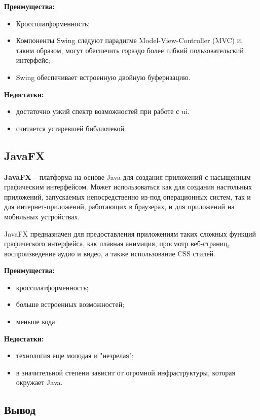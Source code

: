 \textbf{Преимущества:} 
\begin{itemize}
	\item Кроссплатформенность;
	\item Компоненты Swing следуют парадигме Model-View-Controller (MVC) и, таким образом, могут обеспечить гораздо более гибкий пользовательский интерфейс;
	\item Swing обеспечивает встроенную двойную буферизацию.
\end{itemize}

\textbf{Недостатки:} 
\begin{itemize}
	\item достаточно узкий спектр возможностей при работе с ui.
	\item считается устаревшей библиотекой.
\end{itemize}


\subsection{JavaFX}

\textbf{JavaFX} -- платформа на основе Java для создания приложений с насыщенным графическим интерфейсом. Может использоваться как для создания настольных приложений, запускаемых непосредственно из-под операционных систем, так и для интернет-приложений, работающих в браузерах, и для приложений на мобильных устройствах. 

JavaFX предназначен для предоставления приложениям таких сложных функций графического интерфейса, как плавная анимация, просмотр веб-страниц, воспроизведение аудио и видео, а также использование CSS стилей.

\textbf{Преимущества:} 
\begin{itemize}
	\item кроссплатформенность;
	\item больше встроенных возможностей;
	\item меньше кода.
\end{itemize}

\textbf{Недостатки:} 
\begin{itemize}
	\item технология еще молодая и "незрелая";
	\item в значительной степени зависит от огромной инфраструктуры, которая окружает Java.
\end{itemize}



\subsection*{Вывод}

